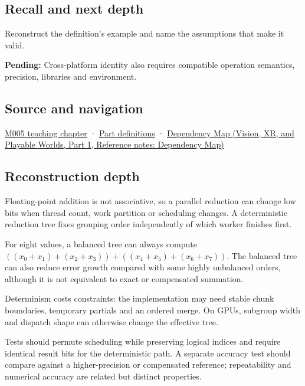 \subsection{Recall and next depth}\label{appendix-4c8e0238e7ee-recall-and-next-depth}

\hypertarget{appendix-4c8e0238e7ee-recall-and-next-depth}{}

Reconstruct the definition's example and name the assumptions that make it valid.

\textbf{Pending:} Cross-platform identity also requires compatible operation semantics, precision, libraries and environment.

\subsection{Source and navigation}\label{appendix-4c8e0238e7ee-source-and-navigation}

\hypertarget{appendix-4c8e0238e7ee-source-and-navigation}{}

\hyperref[01-foundations-i-ch001-when-arithmetic-meets-uncertainty]{M005 teaching chapter} · \hyperref[appendix-fd090d982a15-m005---parts-77-88]{Part definitions} · \href{../07-Vision-XR-and-Playable-Worlds-P01/main.pdf\#nameddest=appendix-4ad47bdd269a}{Dependency Map (Vision, XR, and Playable Worlds, Part 1, Reference notes: Dependency Map)}

\subsection{Reconstruction depth}\label{appendix-4c8e0238e7ee-reconstruction-depth}

\hypertarget{appendix-4c8e0238e7ee-reconstruction-depth}{}

Floating-point addition is not associative, so a parallel reduction can change low bits when thread count, work partition or scheduling changes. A deterministic reduction tree fixes grouping order independently of which worker finishes first.

For eight values, a balanced tree can always compute \(((x_0+x_1)+(x_2+x_3)) + ((x_4+x_5)+(x_6+x_7))\). The balanced tree can also reduce error growth compared with some highly unbalanced orders, although it is not equivalent to exact or compensated summation.

Determinism costs constraints: the implementation may need stable chunk boundaries, temporary partials and an ordered merge. On GPUs, subgroup width and dispatch shape can otherwise change the effective tree.

Tests should permute scheduling while preserving logical indices and require identical result bits for the deterministic path. A separate accuracy test should compare against a higher-precision or compensated reference; repeatability and numerical accuracy are related but distinct properties.
